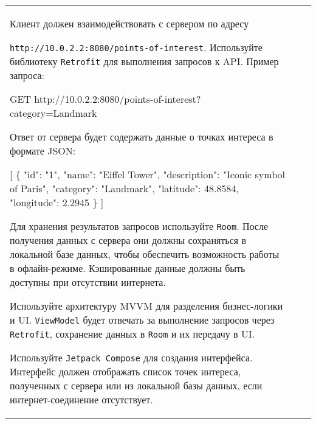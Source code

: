 \documentclass[a4paper]{article}
\begin{document}
\begin{tabular}{!{\vrule width 2pt}p{5cm}|p{6cm}|p{4cm}!{\vrule width 2pt}}
{\begin{minipage}{16cm}
\begin{enumerate}

Клиент должен взаимодействовать с сервером по адресу 

\texttt{http://10.0.2.2:8080/points-of-interest}. Используйте библиотеку \texttt{Retrofit} для выполнения запросов к API. Пример запроса:

 GET http://10.0.2.2:8080/points-of-interest?category=Landmark 

Ответ от сервера будет содержать данные о точках интереса в формате JSON:

 [ \{ "id": "1", "name": "Eiffel Tower", 
    "description": "Iconic symbol of Paris", "category": "Landmark", 
    "latitude": 48.8584, "longitude": 2.2945 \} ] 


Для хранения результатов запросов используйте \texttt{Room}. После получения данных с сервера они должны сохраняться в локальной базе данных, чтобы обеспечить возможность работы в офлайн-режиме. Кэшированные данные должны быть доступны при отсутствии интернета.


Используйте архитектуру MVVM для разделения бизнес-логики и UI. \texttt{ViewModel} будет отвечать за выполнение запросов через \texttt{Retrofit}, сохранение данных в \texttt{Room} и их передачу в UI.


Используйте \texttt{Jetpack Compose} для создания интерфейса. Интерфейс должен отображать список точек интереса, полученных с сервера или из локальной базы данных, если интернет-соединение отсутствует.



\end{enumerate}
\end{minipage}}
\end{tabular}
\end{document}
